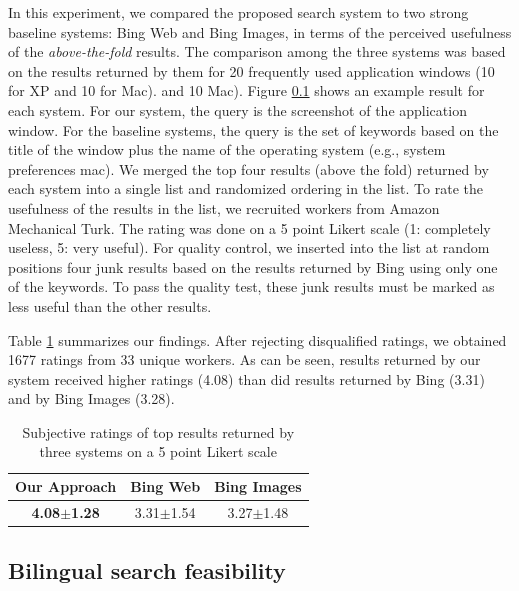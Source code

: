 \documentclass{www2010-submission}
\begin{document}
In this experiment, we compared the proposed search system to two
strong baseline systems: Bing Web and Bing Images, in terms of the
perceived usefulness of the \emph{above-the-fold} results. The
comparison among the three systems was based on the results returned
by them for 20 frequently used application windows (10 for XP and 10
for Mac).  and 10 Mac).  Figure \ref{} shows an example
result for each system. For our system, the query is the screenshot
of the application window. For the baseline systems, the query is the
set of keywords based on the title of the window plus the name of the
operating system (e.g., system preferences mac). We merged the top
four results (above the fold) returned by each system into a single
list and randomized ordering in the list. To rate the usefulness of
the results in the list, we recruited workers from Amazon Mechanical
Turk. The rating was done on a 5 point Likert scale (1: completely
useless, 5: very useful). For quality control, we inserted into the
list at random positions four junk results based on the results
returned by Bing using only one of the keywords. To pass the quality
test, these junk results must be marked as less useful than the other
results.

Table \ref{tbl:comparison_results} summarizes our findings. After
rejecting disqualified ratings, we obtained 1677 ratings from 33
unique workers. As can be seen, results returned by our system
received higher ratings (4.08) than did results returned by Bing
(3.31) and by Bing Images (3.28).

\begin{table}
\centering \caption{Subjective ratings of top results returned by
three systems on a 5 point Likert scale}
\label{tbl:comparison_results}
\vspace{0.2cm}
\begin{tabular}{|c|c|c|}
\hline
        \textbf{Our Approach} & Bing Web & Bing Images \\
\hline
 \textbf{4.08$\pm$1.28} & 3.31$\pm$1.54 & 3.27$\pm$1.48 \\

\hline
\end{tabular}

\end{table}

\subsection{Bilingual search feasibility}
\end{document}
